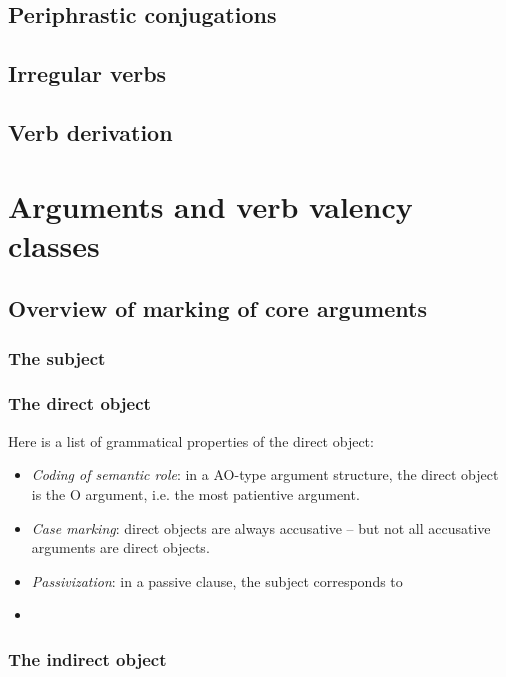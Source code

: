 \documentclass[UTF8, a4paper, oneside]{report}
\begin{document}
\section{Periphrastic conjugations}

\section{Irregular verbs}

\section{Verb derivation}

\chapter{Arguments and verb valency classes}

\section{Overview of marking of core arguments}\label{sec:core-argument-marking}

\subsection{The subject}

\subsection{The direct object}

Here is a list of grammatical properties of the direct object:
\begin{itemize}
    \item \emph{Coding of semantic role}: in a AO-type argument structure, 
    the direct object is the O argument, i.e. the most patientive argument. 

    \item \emph{Case marking}: direct objects are always accusative -- 
    but not all accusative arguments are direct objects.
    \item \emph{Passivization}: in a passive clause, the subject corresponds to 
    \item %
\end{itemize}

\subsection{The indirect object}
\end{document}

